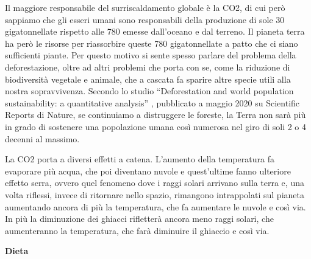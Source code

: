 \documentclass[12pt]{book} %
\begin{document}
Il maggiore responsabile del surriscaldamento globale è la CO2, di cui però sappiamo che gli esseri umani sono responsabili della
produzione di sole 30 gigatonnellate rispetto alle 780 emesse dall'oceano e dal
terreno. Il pianeta terra ha però le risorse per riassorbire queste 780 gigatonnellate a patto che ci siano sufficienti
piante. Per questo motivo si sente spesso parlare del problema della deforestazione, oltre ad altri problemi che porta
con se, come la riduzione di biodiversità vegetale e animale, che a cascata fa sparire altre specie utili alla nostra
sopravvivenza. Secondo lo studio “Deforestation and world population sustainability: a quantitative
analysis” , pubblicato a maggio 2020 su Scientific
Reports di Nature, se continuiamo a distruggere le foreste, la Terra non sarà più in grado di sostenere una popolazione
umana così numerosa nel giro di soli 2 o 4 decenni al massimo.

La CO2 porta a diversi effetti a catena. L'aumento della temperatura fa evaporare più acqua, che poi
diventano nuvole e quest'ultime fanno ulteriore effetto serra, ovvero quel fenomeno dove i raggi
solari arrivano sulla terra e, una volta riflessi, invece di ritornare nello spazio, rimangono intrappolati
sul pianeta aumentando ancora di più la temperatura, che fa aumentare le nuvole e così via. In più la diminuzione dei ghiacci
rifletterà ancora meno raggi solari, che aumenteranno la temperatura, che farà diminuire il ghiaccio e così via. 

\clearpage
\noindent \textbf{\large Dieta} \\
\end{document}
